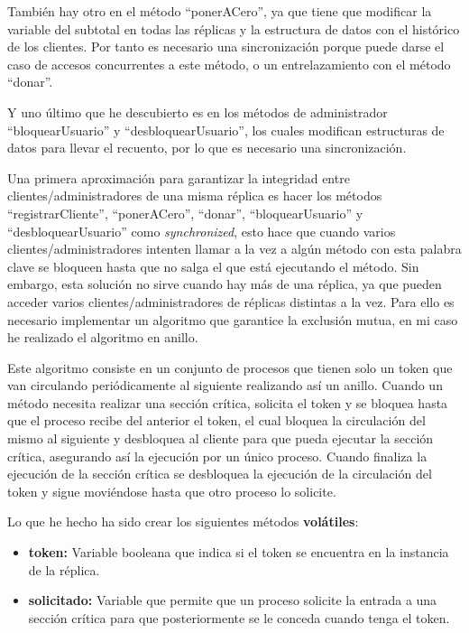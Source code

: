 \documentclass{article}
\begin{document}
También hay otro en el método ``ponerACero'', ya que tiene que modificar la variable del subtotal en todas las réplicas y la estructura de datos con el histórico de los clientes. Por tanto es necesario una sincronización porque puede darse el caso de accesos concurrentes a este método, o un entrelazamiento con el método ``donar''.

Y uno último que he descubierto es en los métodos de administrador ``bloquearUsuario'' y ``desbloquearUsuario'', los cuales modifican estructuras de datos para llevar el recuento, por lo que es necesario una sincronización.

\bigskip

Una primera aproximación para garantizar la integridad entre clientes/administradores de una misma réplica es hacer los métodos ``registrarCliente'', ``ponerACero'', ``donar'', ``bloquearUsuario'' y ``desbloquearUsuario'' como \textit{synchronized}, esto hace que cuando varios clientes/administradores intenten llamar a la vez a algún método con esta palabra clave se bloqueen hasta que no salga el que está ejecutando el método. Sin embargo, esta solución no sirve cuando hay más de una réplica, ya que pueden acceder varios clientes/administradores de réplicas distintas a la vez. Para ello es necesario implementar un algoritmo que garantice la exclusión mutua, en mi caso he realizado el algoritmo en anillo.

\bigskip

Este algoritmo consiste en un conjunto de procesos que tienen solo un token que van circulando periódicamente al siguiente realizando así un anillo. Cuando un método necesita realizar una sección crítica, solicita el token y se bloquea hasta que el proceso recibe del anterior el token, el cual bloquea la circulación del mismo al siguiente y desbloquea al cliente para que pueda ejecutar la sección crítica, asegurando así la ejecución por un único proceso. Cuando finaliza la ejecución de la sección crítica se desbloquea la ejecución de la circulación del token y sigue moviéndose hasta que otro proceso lo solicite.

\bigskip

Lo que he hecho ha sido crear los siguientes métodos \textbf{volátiles}:

\begin{itemize}
    \item \textbf{token: }Variable booleana que indica si el token se encuentra en la instancia de la réplica.
    \item \textbf{solicitado: }Variable que permite que un proceso solicite la entrada a una sección crítica para que posteriormente se le conceda cuando tenga el token.
\end{itemize}
\end{document}
